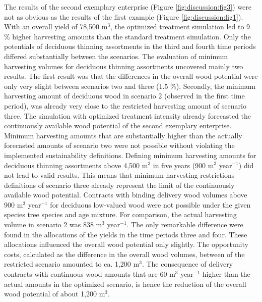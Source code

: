 The results of the second exemplary enterprise (Figure \ref{fig:discussion:fig3}) were not as obvious as the results of the first example (Figure \ref{fig:discussion:fig1}). With an overall yield of 78,500 m$^3$, the optimized treatment simulation led to 9 \% higher harvesting amounts than the standard treatment simulation. Only the potentials of deciduous thinning assortments in the third and fourth time periods differed substantially between the scenarios. The evaluation of minimum harvesting volumes for deciduous thinning assortments uncovered mainly two results. The first result was that the differences in the overall wood potential were only very slight between scenarios two and three (1.5 \%). Secondly, the minimum harvesting amount of deciduous wood in scenario 2 (observed in the first time period), was already very close to the restricted harvesting amount of scenario three. The simulation with optimized treatment intensity already forecasted the continuously available wood potential of the second exemplary enterprise. Minimum harvesting amounts that are substantially higher than the actually forecasted amounts of scenario two were not possible without violating the implemented sustainability definitions. Defining minimum harvesting amounts for deciduous thinning assortments above 4,500 m$^3$ in five years (900 m$^3$ year$^{-1}$) did not lead to valid results. This means that minimum harvesting restrictions definitions of scenario three already represent the limit of the continuously available wood potential. Contracts with binding delivery wood volumes above 900 m$^3$ year$^{-1}$ for deciduous low-valued wood were not possible under the given species tree species and age mixture. For comparison, the actual harvesting volume in scenario 2 was 838 m$^3$ year$^{-1}$. The only remarkable difference were found in the allocations of the yields in the time periods three and four. These allocations influenced the overall wood potential only slightly. The opportunity costs, calculated as the difference in the overall wood volumes, between of the restricted scenario amounted to ca. 1,200 m$^3$. The consequence of delivery contracts with continuous wood amounts that are 60 m$^3$ year$^{-1}$ higher than the actual amounts in the optimized scenario, is hence the reduction of the overall wood potential of about 1,200 m$^3$.


